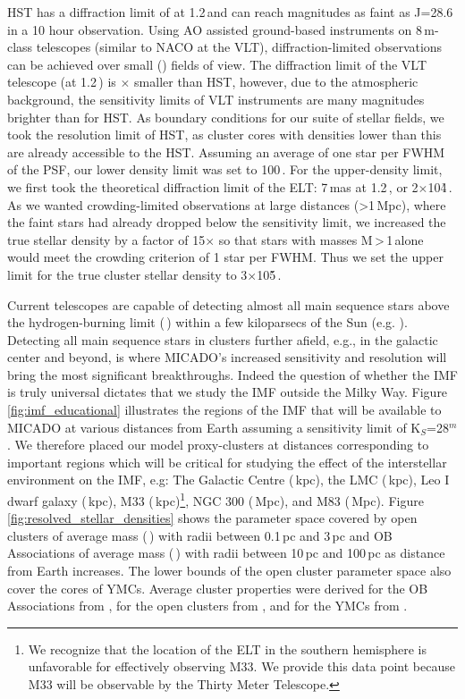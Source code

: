 HST has a diffraction limit of \arcsec at 1.2\,\um and can reach magnitudes as faint as J=28.6\m \citep{hst_wfc3} in a 10 hour observation. Using AO assisted ground-based instruments on 8\,m-class telescopes (similar to NACO at the VLT), diffraction-limited observations can be achieved over small (\arcmin) fields of view. 
The diffraction limit of the VLT telescope (\arcsec at 1.2\,\um) is $\times$ smaller than HST, however, due to the atmospheric background, the sensitivity limits of VLT instruments are many magnitudes brighter than for HST. 
As boundary conditions for our suite of stellar fields, we took the resolution limit of HST, as cluster cores with densities lower than this are already accessible to the HST. 
Assuming an average of one star per FWHM of the PSF, our lower density limit was set to 100\,\spa. 
For the upper-density limit, we first took the theoretical diffraction limit of the ELT: 7\,mas at 1.2\,\ume, or 2$\times$10\h4\,\spae. 
As we wanted crowding-limited observations at large distances (\textgreater1\,Mpc), where the faint stars had already dropped below the sensitivity limit, we increased the true stellar density by a factor of 15$\times$ so that stars with masses M\,\textgreater\,1\,\msun alone would meet the crowding criterion of 1 star per FWHM. 
Thus we set the upper limit for the true cluster stellar density to 3$\times$10\h5\,\spa. 

Current telescopes are capable of detecting almost all main sequence stars above the hydrogen-burning limit (\,\msune) within a few kiloparsecs of the Sun (e.g. \citealt{muzic17}). 
Detecting all main sequence stars in clusters further afield, e.g., in the galactic center and beyond, is where MICADO's increased sensitivity and resolution will bring the most significant breakthroughs. 
Indeed the question of whether the IMF is truly universal dictates that we study the IMF outside the Milky Way. 
Figure \ref{fig:imf_educational} illustrates the regions of the IMF that will be available to MICADO at various distances from Earth assuming a sensitivity limit of K$_S$=28$^m$. 
We therefore placed our model proxy-clusters at distances corresponding to important regions which will be critical for studying the effect of the interstellar environment on the IMF, e.g: The Galactic Centre (\,kpc), the LMC (\,kpc), Leo I dwarf galaxy (\,kpc), M33 (\,kpc)\footnote{We recognize that the location of the ELT in the southern hemisphere is unfavorable for effectively observing M33. We provide this data point because M33 will be observable by the Thirty Meter Telescope.}, NGC 300 (\,Mpc), and M83 (\,Mpc). 
Figure \ref{fig:resolved_stellar_densities} shows the parameter space covered by open clusters of average mass (\,\msun) with radii between 0.1\,pc and 3\,pc and OB Associations of average mass (\,\msun) with radii between 10\,pc and 100\,pc as distance from Earth increases. 
The lower bounds of the open cluster parameter space also cover the cores of YMCs. Average cluster properties were derived for the OB Associations from \citet{melnik1995}, for the open clusters from \citet{piskunov2007}, and for the YMCs from \citet{portegies2010}.


